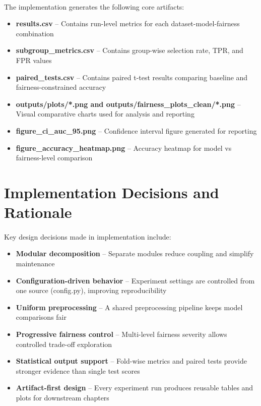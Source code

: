 \paragraph{}

The implementation generates the following core artifacts:

\begin{itemize}
    \item \textbf{results.csv} -- Contains run-level metrics for each dataset-model-fairness combination
    \item \textbf{subgroup\_metrics.csv} -- Contains group-wise selection rate, TPR, and FPR values
    \item \textbf{paired\_tests.csv} -- Contains paired t-test results comparing baseline and fairness-constrained accuracy
    \item \textbf{outputs/plots/*.png and outputs/fairness\_plots\_clean/*.png} -- Visual comparative charts used for analysis and reporting
    \item \textbf{figure\_ci\_auc\_95.png} -- Confidence interval figure generated for reporting
    \item \textbf{figure\_accuracy\_heatmap.png} -- Accuracy heatmap for model vs fairness-level comparison
\end{itemize}

\section{Implementation Decisions and Rationale}
\paragraph{}

Key design decisions made in implementation include:

\begin{itemize}
    \item \textbf{Modular decomposition} -- Separate modules reduce coupling and simplify maintenance
    \item \textbf{Configuration-driven behavior} -- Experiment settings are controlled from one source (config.py), improving reproducibility
    \item \textbf{Uniform preprocessing} -- A shared preprocessing pipeline keeps model comparisons fair
    \item \textbf{Progressive fairness control} -- Multi-level fairness severity allows controlled trade-off exploration
    \item \textbf{Statistical output support} -- Fold-wise metrics and paired tests provide stronger evidence than single test scores
    \item \textbf{Artifact-first design} -- Every experiment run produces reusable tables and plots for downstream chapters
\end{itemize}

